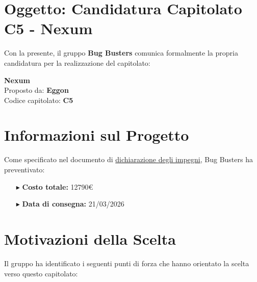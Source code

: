 \documentclass[a4paper,11pt]{article}
\begin{document}
\vspace{2em}

\section*{Oggetto: Candidatura Capitolato C5 - Nexum}

Con la presente, il gruppo \textbf{Bug Busters} comunica formalmente la propria candidatura per la realizzazione del capitolato:

\begin{center}
    {\Large\textbf{Nexum}}\\[0.3cm]
    Proposto da: \textbf{Eggon}\\
    Codice capitolato: \textbf{C5}
\end{center}

\vspace{1.5em}

\section*{Informazioni sul Progetto}

Come specificato nel documento di \href{https://bugbustersunipd.github.io/BugBusterSite/assets/docs/DICHIARAZIONE_IMPEGNI/Dichiarazione_impegni.pdf}{dichiarazione degli impegni}, Bug Busters ha preventivato:

\begin{itemize}[leftmargin=2cm, itemsep=0.5em]
    \item[\textcolor{primarycolor}{$\blacktriangleright$}] \textbf{Costo totale:} 12790€
    \item[\textcolor{primarycolor}{$\blacktriangleright$}] \textbf{Data di consegna:} 21/03/2026
\end{itemize}

\vspace{1.5em}

\section*{Motivazioni della Scelta}

Il gruppo ha identificato i seguenti punti di forza che hanno orientato la scelta verso questo capitolato:
\end{document}
